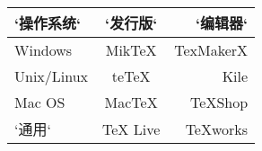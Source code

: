 \begin{tabular}{|l|c|r|}
    \hline
    `操作系统` & `发行版` & `编辑器` \\
    \hline
    Windows     & MikTeX    & TexMakerX \\
    \hline
    Unix/Linux  & teTeX     & Kile \\
    \hline
    Mac OS      & MacTeX    & TeXShop \\
    \hline
    `通用`        & TeX Live  & TeXworks \\
    \hline
\end{tabular}
